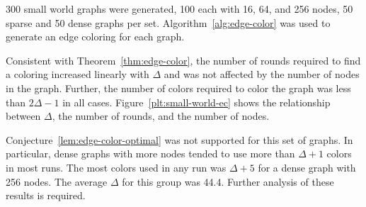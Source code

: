 300 small world graphs were generated, 100 each with 16, 64, and 256 nodes, 50 sparse and 50 dense graphs per set. Algorithm~\ref{alg:edge-color} was used to generate an edge coloring for each graph.

Consistent with Theorem~\ref{thm:edge-color}, the number of rounds required to find a coloring increased linearly with $\Delta$ and was not affected by the number of nodes in the graph. Further, the number of colors required to color the graph was less than $2\Delta -1$ in all cases. Figure~\ref{plt:small-world-ec} shows the relationship between $\Delta$, the number of rounds, and the number of nodes.



Conjecture~\ref{lem:edge-color-optimal} was not supported for this set of graphs. In particular, dense graphs with more nodes tended to use more than $\Delta + 1$ colors in most runs. The most colors used in any run was $\Delta + 5$ for a dense graph with 256 nodes. The average $\Delta$ for this group was 44.4. Further analysis of these results is required. 
